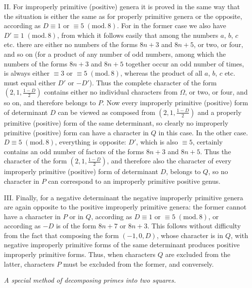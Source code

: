 II. For improperly primitive (positive) genera it is proved in the same way that the situation is either the same as for properly primitive genera or the opposite, according as $D\equiv1$ or $\equiv5\;(\mathrm{mod.}\,8)$. For in the former case we also have $D'\equiv1\;(\mathrm{mod.}\,8)$, from which it follows easily that among the numbers $a$, $b$, $c$ etc. there are either no numbers of the forms $8n+3$ and $8n+5$, or two, or four, and so on (for a product of any number of odd numbers, among which the numbers of the forms $8n+3$ and $8n+5$ together occur an odd number of times, is always either $\equiv3$ or $\equiv5\;(\mathrm{mod.}\,8)$, whereas the product of all $a$, $b$, $c$ etc. must equal either $D'$ or $-D'$). Thus the complete character of the form $(2, 1, \frac{1-D}{2})$ contains either no individual characters from $\Omega$, or two, or four, and so on, and therefore belongs to $P$. Now every improperly primitive (positive) form of determinant $D$ can be viewed as composed from $(2, 1, \frac{1-D}{2})$ and a properly primitive (positive) form of the same determinant, so clearly no improperly primitive (positive) form can have a character in $Q$ in this case. In the other case. $D\equiv5\;(\mathrm{mod.}\,8)$, everything is opposite: $D'$, which is also $\equiv5$, certainly contains an odd number of factors of the forms $8n+3$ and $8n+5$. Thus the character of the form $(2, 1, \frac{1-D}{2})$, and therefore also the character of every improperly primitive (positive) form of determinant $D$, belongs to $Q$, so no character in $P$ can correspond to an improperly primitive positive genus.

III. Finally, for a negative determinant the negative improperly primitive genera are again opposite to the positive improperly primitive genera: the former cannot have a character in $P$ or in $Q$, according as $D\equiv1$ or $\equiv5\;(\mathrm{mod.}\,8)$, or according as $-D$ is of the form $8n+7$ or $8n+3$. This follows without difficulty from the fact that composing the form $(-1, 0, D)$, whose character is in $Q$, with negative improperly primitive forms of the same determinant produces positive improperly primitive forms. Thus, when characters $Q$ are excluded from the latter, characters $P$ must be excluded from the former, and conversely.

\begin{center}
\textit{A special method of decomposing primes into two squares.}
\end{center}

